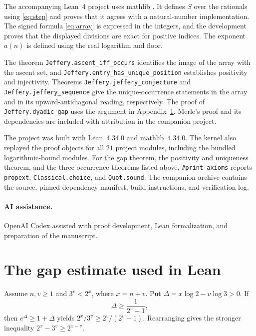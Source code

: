 \documentclass[11pt,a4paper]{amsart}
\begin{document}
The accompanying Lean~4 project \cite{lean} uses mathlib \cite{mathlib}.
It defines \(S\) over the rationals using \eqref{eq:step} and proves
that it agrees with a natural-number implementation. The signed
formula \eqref{eq:array} is expressed in the integers, and the
development proves that the displayed divisions are exact for
positive indices. The exponent \(a(n)\) is defined using the real
logarithm and floor.

The theorem \texttt{Jeffery.ascent\_iff\_occurs} identifies the image
of the array with the ascent set, and
\texttt{Jeffery.entry\_has\_unique\_position} establishes positivity
and injectivity. Theorems \texttt{Jeffery.jeffery\_conjecture} and
\texttt{Jeffery.jeffery\_sequence} give the unique-occurrence statements
in the array and in its upward-antidiagonal reading, respectively.
The proof of \texttt{Jeffery.dyadic\_gap} uses the argument in
Appendix~\ref{sec:formal-gap}. Merle's proof and its dependencies
\cite{merle} are included with attribution in the companion project.

The project was built with Lean~4.34.0 and mathlib~4.34.0. The kernel
also replayed the proof objects for all \(21\) project modules, including
the bundled logarithmic-bound modules. For the gap theorem, the
positivity and uniqueness theorem, and the three occurrence theorems
listed above, \texttt{\#print axioms} reports
\texttt{propext}, \texttt{Classical.choice}, and \texttt{Quot.sound}.
The companion archive  contains the
source, pinned dependency manifest, build instructions, and
verification log.

\paragraph{AI assistance.}
OpenAI Codex assisted with proof development, Lean formalization,
and preparation of the manuscript.

\appendix
\section{The gap estimate used in Lean}\label{sec:formal-gap}

Assume \(n,v\ge1\) and \(3^v<2^x\), where \(x=n+v\). Put
\(\Delta=x\log 2-v\log 3>0\). If
\begin{equation}\label{eq:delta}
  \Delta\ge\frac{1}{2^v-1},
\end{equation}
then \(e^\Delta\ge1+\Delta\) yields
\(2^x/3^v\ge 2^v/(2^v-1)\). Rearranging gives the stronger inequality
\(2^x-3^v\ge 2^{x-v}\).
\end{document}
